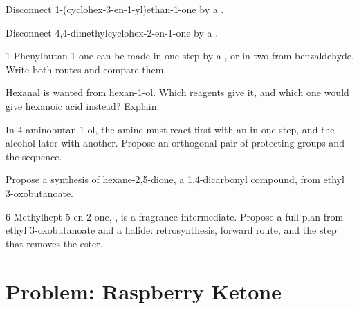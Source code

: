 \begin{exercise}[$\star\star$]\label{exo:b2:retrosynthesis:6}
Disconnect 1-(cyclohex-3-en-1-yl)ethan-1-one by a .
\end{exercise}

\begin{exercise}[$\star\star$]\label{exo:b2:retrosynthesis:7}
Disconnect 4,4-dimethylcyclohex-2-en-1-one by a .
\end{exercise}

\begin{exercise}[$\star\star$]\label{exo:b2:retrosynthesis:8}
1-Phenylbutan-1-one can be made in one step by a , or in two from benzaldehyde.
Write both routes and compare them.
\end{exercise}

\begin{exercise}[$\star\star$]\label{exo:b2:retrosynthesis:9}
Hexanal is wanted from hexan-1-ol. Which reagents give it, and which one would give hexanoic acid
instead? Explain.
\end{exercise}

\begin{exercise}[$\star\star\star$]\label{exo:b2:retrosynthesis:10}
In 4-aminobutan-1-ol, the amine must react first with an  in one step, and the alcohol
later with another. Propose an orthogonal pair of protecting groups and the sequence.
\end{exercise}

\begin{exercise}[$\star\star\star$]\label{exo:b2:retrosynthesis:11}
Propose a synthesis of hexane-2,5-dione, a 1,4-dicarbonyl compound, from ethyl 3-oxobutanoate.
\end{exercise}

\begin{exercise}[$\star\star\star$]\label{exo:b2:retrosynthesis:12}
6-Methylhept-5-en-2-one, , is a fragrance intermediate. Propose a full plan
from ethyl 3-oxobutanoate and a halide: retrosynthesis, forward route, and the step that removes the
ester.
\end{exercise}

\section{Problem: Raspberry Ketone}

